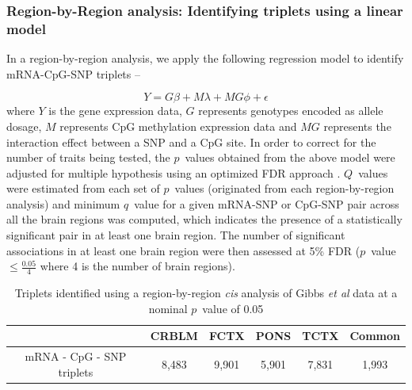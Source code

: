 \documentclass[hidelinks]{article}
\begin{document}

\subsubsection{Region-by-Region analysis: Identifying triplets using a linear model}

In a region-by-region analysis, we apply the following regression model to identify mRNA-CpG-SNP triplets --

\begin{equation*}
Y = G \beta + M \lambda + MG \phi + \epsilon
\end{equation*}
where $Y$ is the gene expression data, $G$ represents genotypes encoded as allele dosage, $M$ represents CpG methylation expression data and $MG$ represents the interaction effect between a SNP and a CpG site. In order to correct for the number of traits being tested, the $p$~values obtained from the above model were adjusted for multiple hypothesis using an optimized FDR approach \cite{qvalue}. $Q$~values were estimated from each set of $p$~values (originated from each region-by-region analysis) and minimum $q$~value for a given mRNA-SNP or CpG-SNP pair across all the brain regions was computed, which indicates the presence of a statistically significant pair in at least one brain region. The number of significant associations in at least one brain region were then assessed at 5\% FDR ($p$~value $\leq \frac{0.05}{4}$ where 4 is the number of brain regions). 

\begin{table}[!ht]
\begin{center}
\begin{tabular}{| c | c | c | c | c | c |}
\hline
& CRBLM & FCTX & PONS & TCTX & Common\\ \hline \hline
mRNA - CpG - SNP triplets & 8,483 & 9,901 & 5,901 & 7,831 & 1,993\\
\hline\hline
\end{tabular}
\end{center}
\caption{Triplets identified using a region-by-region \emph{cis} analysis of Gibbs \emph{et al} data at a nominal $p$~value of 0.05}
\end{table}
\end{document}
